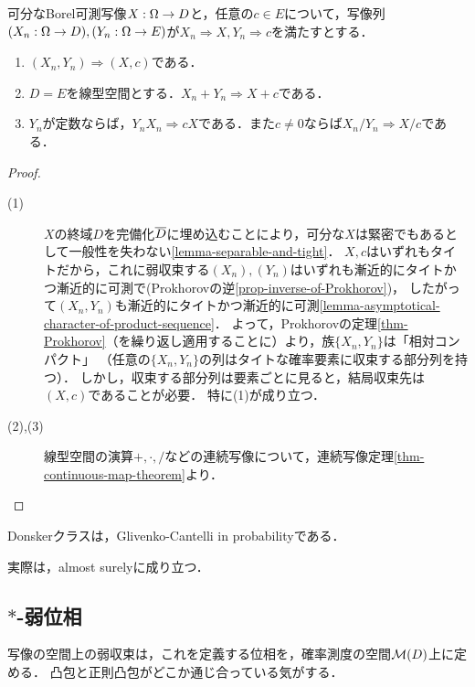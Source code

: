 \documentclass[uplatex,dvipdfmx]{jsreport}
\begin{document}
\begin{theorem}[Slutsky]
    可分なBorel可測写像$X:\Omega\to D$と，任意の$c\in E$について，写像列$(X_n:\Omega\to D),(Y_n:\Omega\to E)$が$X_n\Rightarrow X,Y_n\Rightarrow c$を満たすとする．
    \begin{enumerate}
        \item $(X_n,Y_n)\Rightarrow(X,c)$である．
        \item $D=E$を線型空間とする．$X_n+Y_n\Rightarrow X+c$である．
        \item $Y_n$が定数ならば，$Y_nX_n\Rightarrow cX$である．また$c\ne 0$ならば$X_n/Y_n\Rightarrow X/c$である．
    \end{enumerate}
\end{theorem}
\begin{proof}\mbox{}
    \begin{description}
        \item[(1)] $X$の終域$D$を完備化$\overline{D}$に埋め込むことにより，可分な$X$は緊密でもあるとして一般性を失わない\ref{lemma-separable-and-tight}．
        $X,c$はいずれもタイトだから，これに弱収束する$(X_n),(Y_n)$はいずれも漸近的にタイトかつ漸近的に可測で(Prokhorovの逆\ref{prop-inverse-of-Prokhorov})，
        したがって$(X_n,Y_n)$も漸近的にタイトかつ漸近的に可測\ref{lemma-asymptotical-character-of-product-sequence}．
        よって，Prokhorovの定理\ref{thm-Prokhorov}（を繰り返し適用することに）より，族$\{X_n,Y_n\}$は「相対コンパクト」
        （任意の$\{X_n,Y_n\}$の列はタイトな確率要素に収束する部分列を持つ）．
        しかし，収束する部分列は要素ごとに見ると，結局収束先は$(X,c)$であることが必要．
        特に(1)が成り立つ．
        \item[(2),(3)]
        線型空間の演算$+,\cdot,/$などの連続写像について，連続写像定理\ref{thm-continuous-map-theorem}より．
    \end{description}
\end{proof}

\begin{corollary}
    Donskerクラスは，Glivenko-Cantelli in probabilityである．
\end{corollary}
\begin{remarks}
    実際は，almost surelyに成り立つ．
\end{remarks}

\subsection{$*$-弱位相}

\begin{tcolorbox}[colframe=ForestGreen, colback=ForestGreen!10!white,breakable,colbacktitle=ForestGreen!40!white,coltitle=black,fonttitle=\bfseries\sffamily,
title=]
    写像の空間上の弱収束は，これを定義する位相を，確率測度の空間$\mathcal{M}(D)$上に定める．
    凸包と正則凸包がどこか通じ合っている気がする．
\end{tcolorbox}
\end{document}
